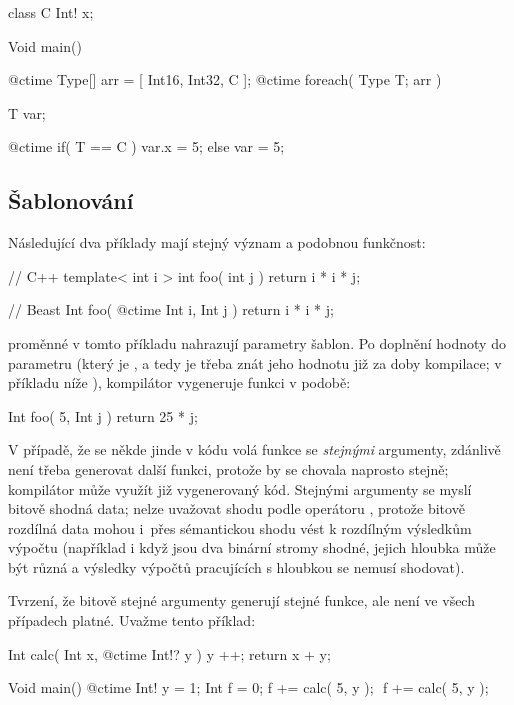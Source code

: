 \begin{code}
class C { 
	Int! x;
}
	
Void main() {
	@ctime Type[] arr = [ Int16, Int32, C ];
	@ctime foreach( Type T; arr ) {
		T var;
		
		@ctime if( T == C )
			var.x = 5;
		else
			var = 5;
	}
}
\end{code}

\subsection{Šablonování}
Následující dva příklady mají stejný význam a podobnou funkčnost:

\begin{cppcode}
// C++
template< int i >
int foo( int j ) {
	return i * i * j;
}
\end{cppcode}

\begin{code}
// Beast
Int foo( @ctime Int i, Int j ) {
	return i * i * j;
}
\end{code}

\ctime proměnné v tomto příkladu nahrazují parametry šablon. Po doplnění hodnoty do parametru  (který je \ctime, a tedy je třeba znát jeho hodnotu již za doby kompilace; v příkladu níže ), kompilátor vygeneruje funkci v podobě:

\begin{code}
Int foo( 5, Int j ) {
	return 25 * j;
}
\end{code}

V případě, že se někde jinde v kódu volá funkce  se \textit{stejnými} \ctime argumenty, zdánlivě není třeba generovat další funkci, protože by se chovala naprosto stejně; kompilátor může využít již vygenerovaný kód. Stejnými \ctime argumenty se myslí bitově shodná data; nelze uvažovat shodu podle operátoru \inlineCode{==}, protože bitově rozdílná data mohou i~přes sémantickou shodu vést k rozdílným výsledkům výpočtu (například i když jsou dva binární stromy shodné, jejich hloubka může být různá a výsledky výpočtů pracujících s hloubkou se nemusí shodovat).

Tvrzení, že bitově stejné \ctime argumenty generují stejné funkce, ale není ve všech případech platné. Uvažme tento příklad:

\begin{code}
Int calc( Int x, @ctime Int!? y ) {
	y ++;
	return x + y;
}

Void main() {
	@ctime Int! y = 1;
	Int f = 0;
	f += calc( 5, y ); $\label{ctime:impl:templ:1}$
	f += calc( 5, y ); $\label{ctime:impl:templ:2}$
}
\end{code}

